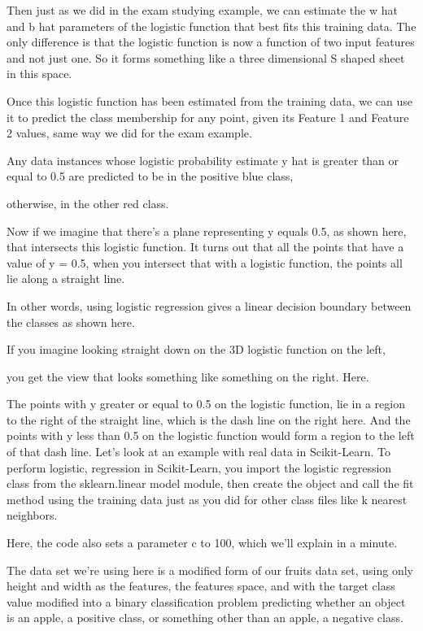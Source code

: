 \begin{multicols}{2}
Then just as we did in the exam studying example, we can estimate the w hat and b hat parameters of the logistic function that best fits this training data. The only difference is that the logistic function is now a function of two input features and not just one. So it forms something like a three dimensional S shaped sheet in this space. 

Once this logistic function has been estimated from the training data, we can use it to predict the class membership for any point, given its Feature 1 and Feature 2 values, same way we did for the exam example. 

Any data instances whose logistic probability estimate y hat is greater than or equal to 0.5 are predicted to be in the positive blue class, 

otherwise, in the other red class. 

Now if we imagine that there's a plane representing y equals 0.5, as shown here, that intersects this logistic function. It turns out that all the points that have a value of y = 0.5, when you intersect that with a logistic function, the points all lie along a straight line. 

In other words, using logistic regression gives a linear decision boundary between the classes as shown here. 

If you imagine looking straight down on the 3D logistic function on the left, 

you get the view that looks something like something on the right. Here. 

The points with y greater or equal to 0.5 on the logistic function, lie in a region to the right of the straight line, which is the dash line on the right here. And the points with y less than 0.5 on the logistic function would form a region to the left of that dash line. Let's look at an example with real data in Scikit-Learn. To perform logistic, regression in Scikit-Learn, you import the logistic regression class from the sklearn.linear model module, then create the object and call the fit method using the training data just as you did for other class files like k nearest neighbors. 

Here, the code also sets a parameter c to 100, which we'll explain in a minute. 

The data set we're using here is a modified form of our fruits data set, using only height and width as the features, the features space, and with the target class value modified into a binary classification problem predicting whether an object is an apple, a positive class, or something other than an apple, a negative class. 


\end{multicols}
